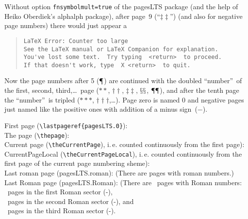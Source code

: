 \documentclass[british]{article}
\begin{document}
Without option \texttt{fnsymbolmult=true} of the \textsf{pagesLTS} package
(and the help of Heiko Oberdiek's \textsf{alphalph} package),
after page~9
(\textquotedblleft \ensuremath {\ddagger \ddagger }\textquotedblright )
(and also for negative page numbers) there would just appear a
\begin{quote}
\begin{verbatim}
LaTeX Error: Counter too large
See the LaTeX manual or LaTeX Companion for explanation.
You've lost some text.  Try typing  <return>  to proceed.
If that doesn't work, type  X <return>  to quit.
\end{verbatim}
\end{quote}
Now the page numbers after 5 (\ensuremath  {\mathparagraph }) are
continued  with the doubled \textquotedblleft number\textquotedblright\ of
the first, second, third,\ldots\ page (\ensuremath  {**},
\ensuremath  {\dagger \dagger }, \ensuremath  {\ddagger \ddagger },
\ensuremath  {\mathsection \mathsection },
\ensuremath  {\mathparagraph \mathparagraph }),
and after the tenth page the \textquotedblleft number\textquotedblright\ is
tripled (\ensuremath  {***}, \ensuremath  {\dagger \dagger \dagger },\ldots).
Page zero is named 0 and negative pages just named like the positive ones
with addition of a minus sign~($-$).

\bigskip

\noindent First page (\texttt{\textbackslash lastpageref\{pagesLTS.0\}}):
\\

\noindent The page (\texttt{\textbackslash thepage}): \thepage \\

\noindent Current page (\texttt{\textbackslash theCurrentPage}),
i.\,e. counted continuously from the first page): \theCurrentPage \\

\noindent CurrentPageLocal (\texttt{\textbackslash theCurrentPageLocal}),
i.\,e. counted continuously from the first page of the
current page numbering sheme): \theCurrentPageLocal \\

\noindent Last roman page (pagesLTS.roman): 
(There are  pages with roman numbers.)\\

\noindent Last Roman page (pagesLTS.Roman): 
(There are ~pages with Roman numbers:\\
~pages in the first Roman sector
(\pageref{Roman}{\hskip3em }-),\\
~pages in the second Roman sector
(\pageref{Roman2}{\hskip3em }-), and\\
~pages in the third Roman sector
(\pageref{Roman3}{\hskip3em }-).\\
\end{document}
